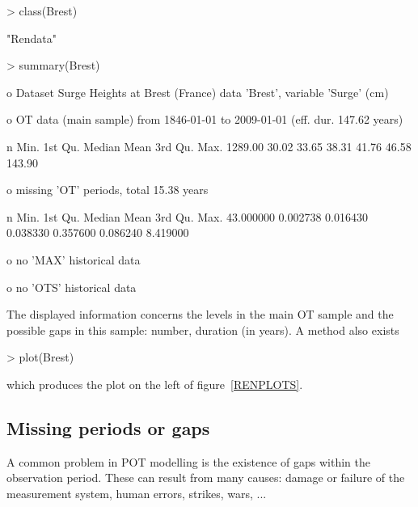 \documentclass[a4paper]{report}
\begin{document}
\begin{Schunk}
\begin{Sinput}
> class(Brest)
\end{Sinput}
\begin{Soutput}
[1] "Rendata"
\end{Soutput}
\begin{Sinput}
> summary(Brest)
\end{Sinput}
\begin{Soutput}
o Dataset Surge Heights at Brest (France)
   data 'Brest', variable 'Surge' (cm) 

o OT data (main sample) from  1846-01-01  to  2009-01-01  (eff. dur. 147.62 years)
 
      n    Min. 1st Qu.  Median    Mean 3rd Qu.    Max. 
1289.00   30.02   33.65   38.31   41.76   46.58  143.90 

o missing 'OT' periods, total 15.38 years 

        n      Min.   1st Qu.    Median      Mean   3rd Qu.      Max. 
43.000000  0.002738  0.016430  0.038330  0.357600  0.086240  8.419000 

o no 'MAX' historical data 

o no 'OTS' historical data 
\end{Soutput}
\end{Schunk}

\noindent
The displayed information concerns the levels in the main OT sample
and the possible gaps in this sample: number, duration (in years).
A \verb@plot@ method also exists

\begin{Schunk}
\begin{Sinput}
> plot(Brest)
\end{Sinput}
\end{Schunk}

\noindent
which produces the plot on the left of figure~\ref{RENPLOTS}.

%

\subsection{Missing periods or gaps}
% 
%
A common problem in POT modelling is the existence of gaps within the
observation period. These can result from many causes: damage or
failure of the measurement system, human errors, strikes, wars, ...
\end{document}
